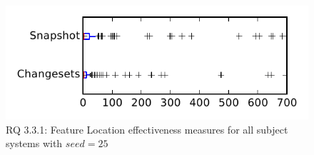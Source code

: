 
\begin{figure}
\centering
\includegraphics[height=0.4\textheight]{figures/flt_seed/rq1_tiny_25}
\caption{RQ 3.3.1: Feature Location effectiveness measures for all subject systems with $seed=25$}
\label{fig:flt_seed:rq1:tiny}
\end{figure}
